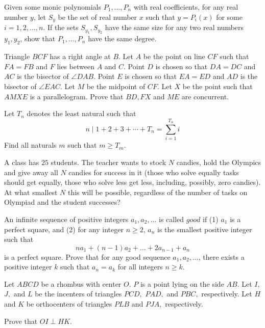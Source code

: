 \documentclass[11pt]{scrartcl}
\begin{document}
\begin{problem}[988108242834730]
Given some monic polynomials $P_1, \ldots, P_n$ with real coefficients, for any real number $y$, let $S_y$ be the set of real number $x$ such that $y = P_i(x)$ for some $i = 1, 2, ..., n$. If the sets $S_{y_1}, S_{y_2}$ have the same size for any two real numbers $y_1, y_2$, show that $P_1, \ldots, P_n$ have the same degree.
\end{problem}
\begin{problem}[741259148493039]
	Triangle $BCF$ has a right angle at $B$. Let $A$ be the point on line $CF$ such that $FA=FB$ and $F$ lies between $A$ and $C$. Point $D$ is chosen so that $DA=DC$ and $AC$ is the bisector of $\angle{DAB}$. Point $E$ is chosen so that $EA=ED$ and $AD$ is the bisector of $\angle{EAC}$. Let $M$ be the midpoint of $CF$. Let $X$ be the point such that $AMXE$ is a parallelogram. Prove that $BD,FX$ and $ME$ are concurrent.
\end{problem}
\begin{problem}[1918325703156767787]
Let $T_n$ denotes the least natural such that
$$n\mid 1+2+3+\cdots +T_n=\sum_{i=1}^{T_n} i$$Find all naturals $m$ such that $m\ge T_m$.

\end{problem}
\begin{problem}[458902414604417]
	A class has $25$ students. The teacher wants to stock $N$ candies, hold the Olympics and give away all $N$ candies for success in it (those who solve equally tasks should get equally, those who solve less get less, including, possibly, zero candies). At what smallest $N$ this will be possible, regardless of the number of tasks on Olympiad and the student successes?
\end{problem}
\begin{problem}[6444187106925350071]
	An infinite sequence of positive integers $a_1, a_2, \dots$ is called $good$ if
(1) $a_1$ is a perfect square, and
(2) for any integer $n \ge 2$, $a_n$ is the smallest positive integer such that$$na_1 + (n-1)a_2 + \dots + 2a_{n-1} + a_n$$is a perfect square.
Prove that for any good sequence $a_1, a_2, \dots$, there exists a positive integer $k$ such that $a_n=a_k$ for all integers $n \ge k$.
\end{problem}
\begin{problem}[857598260795435]
Let $ ABCD $ be a rhombus with center $ O. $ $ P $ is a point lying on the side $ AB. $ Let $ I, $ $ J, $ and $ L $ be the incenters of triangles $ PCD, $ $ PAD, $ and $PBC, $ respectively. Let $ H $ and $ K $ be orthocenters of triangles $ PLB $ and $ PJA, $ respectively.

Prove that $ OI \perp HK. $
\end{problem}
\end{document}
